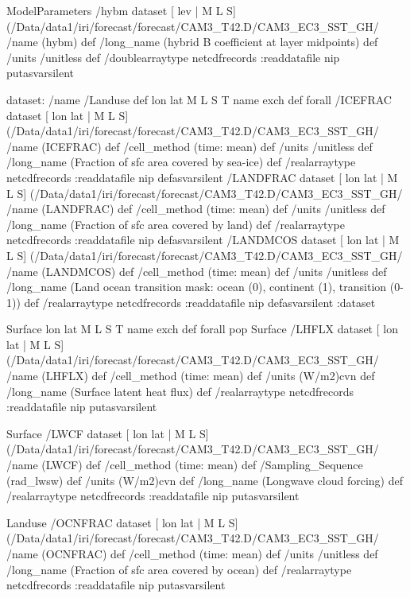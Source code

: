 \begin{ingrid}
ModelParameters /hybm{
dataset
[ lev | M L S] (/Data/data1/iri/forecast/forecast/CAM3_T42.D/CAM3_EC3_SST_GH/%
/name (hybm) def
 /long_name (hybrid B coefficient at layer midpoints) def
 /units /unitless def
 /doublearraytype netcdfrecords :readdatafile
nip
}putasvarsilent


dataset: /name /Landuse def
{ lon lat M L S T } { name exch def } forall
 /ICEFRAC{
dataset
[ lon lat | M L S] (/Data/data1/iri/forecast/forecast/CAM3_T42.D/CAM3_EC3_SST_GH/%
/name (ICEFRAC) def
 /cell_method (time: mean) def
 /units /unitless def
 /long_name (Fraction of sfc area covered by sea-ice) def
 /realarraytype netcdfrecords :readdatafile
nip
}defasvarsilent
 /LANDFRAC{
dataset
[ lon lat | M L S] (/Data/data1/iri/forecast/forecast/CAM3_T42.D/CAM3_EC3_SST_GH/%
/name (LANDFRAC) def
 /cell_method (time: mean) def
 /units /unitless def
 /long_name (Fraction of sfc area covered by land) def
 /realarraytype netcdfrecords :readdatafile
nip
}defasvarsilent
 /LANDMCOS{
dataset
[ lon lat | M L S] (/Data/data1/iri/forecast/forecast/CAM3_T42.D/CAM3_EC3_SST_GH/%
/name (LANDMCOS) def
 /cell_method (time: mean) def
 /units /unitless def
 /long_name (Land ocean transition mask: ocean (0), continent (1), transition (0-1)) def
 /realarraytype netcdfrecords :readdatafile
nip
}defasvarsilent
:dataset

Surface { lon lat M L S T } { name exch def } forall pop
Surface /LHFLX{
dataset
[ lon lat | M L S] (/Data/data1/iri/forecast/forecast/CAM3_T42.D/CAM3_EC3_SST_GH/%
/name (LHFLX) def
 /cell_method (time: mean) def
 /units (W/m2)cvn def
 /long_name (Surface latent heat flux) def
 /realarraytype netcdfrecords :readdatafile
nip
}putasvarsilent


Surface /LWCF{
dataset
[ lon lat | M L S] (/Data/data1/iri/forecast/forecast/CAM3_T42.D/CAM3_EC3_SST_GH/%
/name (LWCF) def
 /cell_method (time: mean) def
 /Sampling_Sequence (rad_lwsw) def
 /units (W/m2)cvn def
 /long_name (Longwave cloud forcing) def
 /realarraytype netcdfrecords :readdatafile
nip
}putasvarsilent




Landuse /OCNFRAC{
dataset
[ lon lat | M L S] (/Data/data1/iri/forecast/forecast/CAM3_T42.D/CAM3_EC3_SST_GH/%
/name (OCNFRAC) def
 /cell_method (time: mean) def
 /units /unitless def
 /long_name (Fraction of sfc area covered by ocean) def
 /realarraytype netcdfrecords :readdatafile
nip
}putasvarsilent


\end{ingrid}
